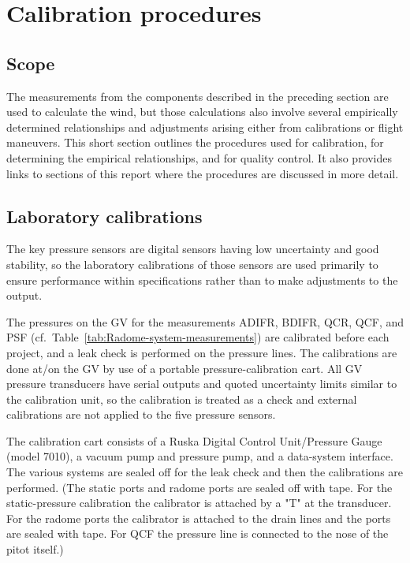 \documentclass[12pt,twoside,english]{article}\usepackage[]{graphicx}\usepackage[]{color}
\let\stdsection\section
\renewcommand{\section}{\newpage\stdsection}
\let\OrgIndex\index
\renewcommand*{\index}[1]{\OrgIndex{#1}}
\begin{document}
{{\section{Calibration procedures\label{sec:CalProcedures}}

\subsection{Scope}

The measurements from the components described in the preceding section are used to calculate the wind, but those calculations also involve several empirically determined relationships and adjustments arising either from calibrations or flight maneuvers. This short section outlines the procedures used for calibration, for determining the empirical relationships, and for quality control. It also provides links to sections of this report where the procedures are discussed in more detail.

\subsection{Laboratory calibrations}

The key pressure sensors are digital sensors having low uncertainty and good stability, so the laboratory calibrations of those sensors are used primarily to ensure performance within specifications rather than to make adjustments to the output. 

The pressures on the GV for the measurements ADIFR, BDIFR, QCR, QCF, and PSF (cf.~Table~\ref{tab:Radome-system-measurements}) are calibrated before each project, and a leak check is performed on the pressure lines. The calibrations are done at/on the GV by use of a portable pressure-calibration cart. All GV pressure transducers have serial outputs and quoted uncertainty limits similar to the calibration unit, so the calibration is treated as a check and external calibrations are not applied to the five pressure sensors.  

The calibration cart consists of a Ruska Digital Control Unit/Pressure Gauge (model 7010), a vacuum pump and pressure pump, and a data-system interface. The various systems are sealed off for the leak check and then the calibrations are performed. (The static ports and radome ports are sealed off with tape. For the static-pressure calibration the calibrator is attached by a "T" at the transducer. For the radome ports the calibrator is attached to the drain lines and the ports are sealed with tape. For QCF the pressure line is connected to the nose of the pitot itself.)

}}
\end{document}
